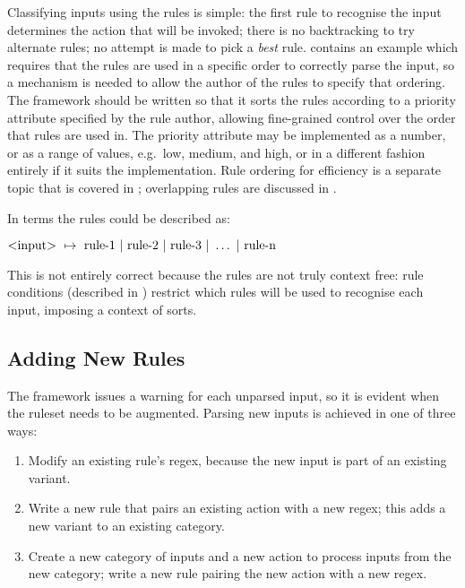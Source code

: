 Classifying inputs using the rules is simple: the first rule to recognise
the input determines the action that will be invoked; there is no
backtracking to try alternate rules; no attempt is made to pick a
\textit{best\/} rule.   contains
an example which requires that the rules are used in a specific order to
correctly parse the input, so a mechanism is needed to allow the author of
the rules to specify that ordering.  The framework should be written so
that it sorts the rules according to a priority attribute specified by the
rule author, allowing fine-grained control over the order that rules are
used in.  The priority attribute may be implemented as a number, or as a
range of values, e.g.\ low, medium, and high, or in a different fashion
entirely if it suits the implementation.  Rule ordering for efficiency is a
separate topic that is covered in ; overlapping rules are discussed in .

In  terms the rules could be described as:

$\text{\textless{}input\textgreater{}}~\mapsto{}~\text{rule-1}~|~\text{rule-2}~|~\text{rule-3}~|~\dots~|~\text{rule-n}$

This is not entirely correct because the rules are not truly context free:
rule conditions (described in )
restrict which rules will be used to recognise each input, imposing a
context of sorts.

\subsection{Adding New Rules}

The framework issues a warning for each unparsed input, so it is evident
when the ruleset needs to be augmented.  Parsing new inputs is achieved in
one of three ways:

\begin{enumerate}

    \item Modify an existing rule's regex, because the new input is part of
        an existing variant.

    \item Write a new rule that pairs an existing action with a new regex;
        this adds a new variant to an existing category.

    \item Create a new category of inputs and a new action to process
        inputs from the new category; write a new rule pairing the new
        action with a new regex.

\end{enumerate}

